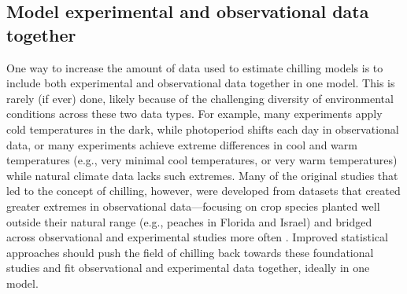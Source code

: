\documentclass[11pt]{article}
\begin{document}
\subsection*{Model experimental and observational data together} 
One way to increase the amount of data used to estimate chilling models is to include both experimental and observational data together in one model. This is rarely (if ever) done, likely because of the challenging diversity of environmental conditions across these two data types. For example, many experiments apply cold temperatures in the dark, while photoperiod shifts each day in observational data, or many experiments achieve extreme differences in cool and warm temperatures (e.g., very minimal cool temperatures, or very warm temperatures) while natural climate data lacks such extremes. Many of the original studies that led to the concept of chilling, however, were developed from datasets that created greater extremes in observational data---focusing on crop species planted well outside their natural range (e.g., peaches in Florida and Israel) and bridged across observational and experimental studies more often \citep{erez1971,richardson1974}. Improved statistical approaches should push the field of chilling back towards these foundational studies and fit observational and experimental data together, ideally in one model. 
\end{document}

